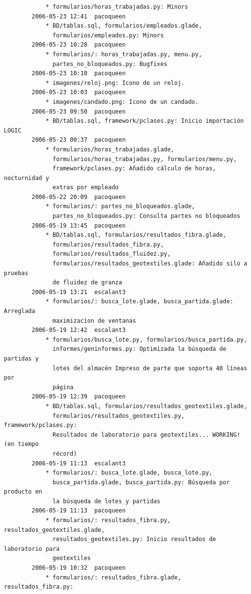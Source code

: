 \documentclass[a4paper]{article}
\begin{document}
\begin{verbatim}
            * formularios/horas_trabajadas.py: Minors
        2006-05-23 12:41  pacoqueen
            * BD/tablas.sql, formularios/empleados.glade,
              formularios/empleados.py: Minors
        2006-05-23 10:28  pacoqueen
            * formularios/: horas_trabajadas.py, menu.py,
              partes_no_bloqueados.py: Bugfixes
        2006-05-23 10:10  pacoqueen
            * imagenes/reloj.png: Icono de un reloj. 
        2006-05-23 10:03  pacoqueen
            * imagenes/candado.png: Icono de un candado. 
        2006-05-23 09:50  pacoqueen
            * BD/tablas.sql, framework/pclases.py: Inicio importación LOGIC
        2006-05-23 00:37  pacoqueen
            * formularios/horas_trabajadas.glade,
              formularios/horas_trabajadas.py, formularios/menu.py,
              framework/pclases.py: Añadido cálculo de horas, nocturnidad y
              extras por empleado
        2006-05-22 20:09  pacoqueen
            * formularios/: partes_no_bloqueados.glade,
              partes_no_bloqueados.py: Consulta partes no bloqueados
        2006-05-19 13:45  pacoqueen
            * BD/tablas.sql, formularios/resultados_fibra.glade,
              formularios/resultados_fibra.py,
              formularios/resultados_fluidez.py,
              formularios/resultados_geotextiles.glade: Añadido silo a pruebas
              de fluidez de granza
        2006-05-19 13:21  escalant3
            * formularios/: busca_lote.glade, busca_partida.glade: Arreglada
              maximizacion de ventanas
        2006-05-19 12:42  escalant3
            * formularios/busca_lote.py, formularios/busca_partida.py,
              informes/geninformes.py: Optimizada la búsqueda de partidas y
              lotes del almacén Impreso de parte que soporta 40 líneas por
              página
        2006-05-19 12:39  pacoqueen
            * BD/tablas.sql, formularios/resultados_geotextiles.glade,
              formularios/resultados_geotextiles.py, framework/pclases.py:
              Resultados de laboratorio para geotextiles... WORKING! (en tiempo
              récord)
        2006-05-19 11:13  escalant3
            * formularios/: busca_lote.glade, busca_lote.py,
              busca_partida.glade, busca_partida.py: Búsqueda por producto en
              la búsqueda de lotes y partidas
        2006-05-19 11:13  pacoqueen
            * formularios/: resultados_fibra.py, resultados_geotextiles.glade,
              resultados_geotextiles.py: Inicio resultados de laboratorio para
              geotextiles
        2006-05-19 10:32  pacoqueen
            * formularios/: resultados_fibra.glade, resultados_fibra.py:

\end{verbatim}
\end{document}
